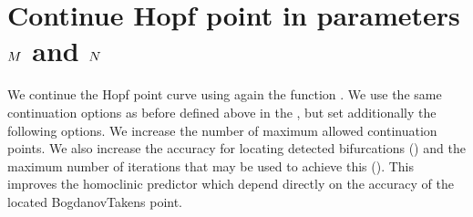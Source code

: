 \documentclass[letterpaper,10pt,english]{jupyterBook}
\begin{document}
\begin{sphinxVerbatim}[commandchars=\\\{\}]
\PYG{p}{[}\PYG{p}{]}
\PYG{p}{[}\PYG{p}{]}
\end{sphinxVerbatim}


\section{Continue Hopf point in parameters \protect\(M\protect\) and \protect\(N\protect\)}
\label{\detokenize{HomoclinicRGflows:continue-hopf-point-in-parameters-m-and-n}}
\sphinxAtStartPar
We continue the Hopf point curve using again the function . We use the
same continuation options as before defined above in the  , but
set additionally the following options. We increase the number of maximum
allowed continuation points. We also increase the accuracy for locating
detected bifurcations () and the maximum number of iterations
that may be used to achieve this (). This improves the homoclinic
predictor which depend directly on the accuracy of the located Bogdanov\sphinxhyphen{}Takens
point.
\end{document}
